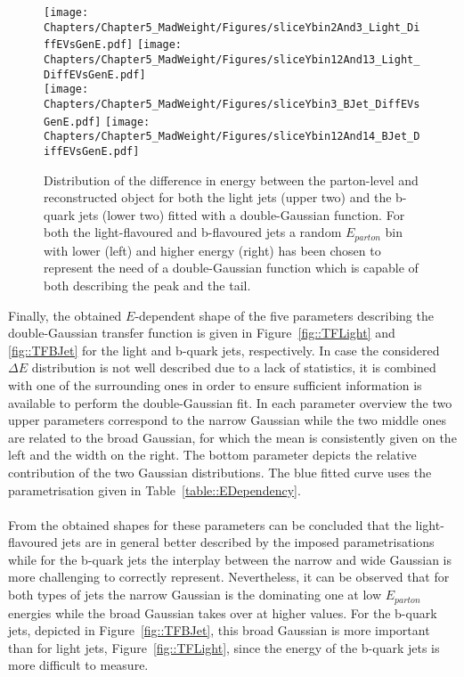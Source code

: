 \begin{figure}[h!tp]
 \centering
 \texttt{[image: Chapters/Chapter5\_MadWeight/Figures/sliceYbin2And3\_Light\_DiffEVsGenE.pdf]} \hspace{0.2cm}
 \texttt{[image: Chapters/Chapter5\_MadWeight/Figures/sliceYbin12And13\_Light\_DiffEVsGenE.pdf]} \vspace{0.1cm} \\
 \texttt{[image: Chapters/Chapter5\_MadWeight/Figures/sliceYbin3\_BJet\_DiffEVsGenE.pdf]} \hspace{0.2cm}
 \texttt{[image: Chapters/Chapter5\_MadWeight/Figures/sliceYbin12And14\_BJet\_DiffEVsGenE.pdf]}
 \caption{Distribution of the difference in energy between the parton-level and reconstructed object for both the light jets (upper two) and the b-quark jets (lower two) fitted with a double-Gaussian function. For both the light-flavoured and b-flavoured jets a random $E_{parton}$ bin with lower (left) and higher energy (right) has been chosen to represent the need of a double-Gaussian function which is capable of both describing the peak and the tail.} \label{fig::TFSlices}
\end{figure}

Finally, the obtained $E$-dependent shape of the five parameters describing the double-Gaussian transfer function is given in Figure~\ref{fig::TFLight} and \ref{fig::TFBJet} for the light and b-quark jets, respectively. In case the considered $\Delta E$ distribution is not well described due to a lack of statistics, it is combined with one of the surrounding ones in order to ensure sufficient information is available to perform the double-Gaussian fit.
In each parameter overview the two upper parameters correspond to the narrow Gaussian while the two middle ones are related to the broad Gaussian, for which the mean is consistently given on the left and the width on the right. The bottom parameter depicts the relative contribution of the two Gaussian distributions. The blue fitted curve uses the parametrisation given in Table~\ref{table::EDependency}.
\\
\\
From the obtained shapes for these parameters can be concluded that the light-flavoured jets are in general better described by the imposed parametrisations while for the b-quark jets the interplay between the narrow and wide Gaussian is more challenging to correctly represent. Nevertheless, it can be observed that for both types of jets the narrow Gaussian is the dominating one at low $E_{parton}$ energies while the broad Gaussian takes over at higher values.
For the b-quark jets, depicted in Figure~\ref{fig::TFBJet}, this broad Gaussian is more important than for light jets, Figure~\ref{fig::TFLight}, since the energy of the b-quark jets is more difficult to measure.

